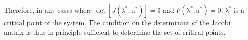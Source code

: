 \documentclass[
11pt, %
english, %
singlespacing, %
liststotoc, %
headsepline, %
]{MastersDoctoralThesis} %
\newcommand{\myvec}[1]{\boldsymbol{\mathrm{#1}}} %
\newcommand{\lambdavec}{\myvec{\lambda}}
\newcommand{\uvec}{\myvec{u}}
\begin{document}
Therefore, in any cases where $\det\left[ J(\lambdavec^*, \uvec^*) \right] = 0$ and $F(\lambdavec^*, \uvec^*) = 0$, $\lambdavec^*$ is a critical point of the system. The condition on the determinant of the Jacobi matrix is thus in principle sufficient to determine the set of critical points.


\appendix %



\printbibliography[heading=bibintoc]

\end{document}
